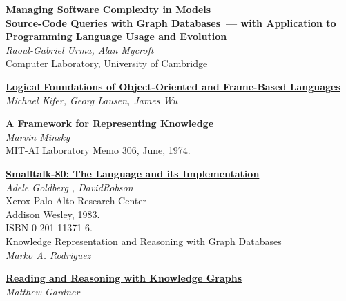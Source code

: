 \begin{thebibliography}{99}

\href{https://insights.sei.cmu.edu/sei_blog/2015/09/managing-software-complexity-in-models.html}{\textbf{Managing
Software Complexity in Models}}\\

\href{https://www.repository.cam.ac.uk/bitstream/handle/1810/247929/Urma%20and%20Mycroft%202013%20Science%20of%20Computer%20Programming.pdf}{\textbf{Source-Code
Queries with Graph Databases\ --- with Application to Programming Language Usage and Evolution}}\\
\textit{Raoul-Gabriel Urma, Alan Mycroft}\\
Computer Laboratory, University of Cambridge

\href{http://www3.cs.stonybrook.edu/~kifer/TechReports/flogic.pdf}{\textbf{Logical
Foundations of Object-Oriented and Frame-Based Languages}}\\
\textit{Michael Kifer, Georg Lausen, James Wu}

\href{https://web.media.mit.edu/~minsky/papers/Frames/frames.html}{\textbf{A
Framework for Representing Knowledge}}\\
\textit{Marvin Minsky}\\
MIT-AI Laboratory Memo 306, June, 1974.

\href{http://stephane.ducasse.free.fr/FreeBooks/BlueBook/Bluebook.pdf}{\textbf{Smalltalk-80:
The Language and its Implementation}}\\
\textit{Adele Goldberg , DavidRobson}\\
Xerox Palo Alto Research Center\\
Addison Wesley, 1983.\\
ISBN 0-201-11371-6.\\

\href{https://markorodriguez.com/2011/02/23/knowledge-representation-and-reasoning-with-graph-databases/}{Knowledge
Representation and Reasoning with Graph Databases}\\
\textit{Marko A. Rodriguez}

\textbf{\href{http://www.cs.cmu.edu/~mg1/thesis.pdf}{Reading and Reasoning
with Knowledge Graphs}}\\
\textit{Matthew Gardner}

\end{thebibliography}
